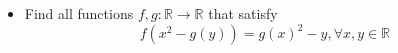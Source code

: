 \documentclass[11pt]{scrartcl}
\begin{document}
\begin{itemize}[label=,itemsep=0.4em,leftmargin=0em]
\begin{comment}
        Combining this with $(2)$, we conclude that the function satisfying these conditions is $f(m) = m, \forall m \in \bb{Z^+}$.

    \end{comment}

    \item \begin{btvn}
        Find all functions $f,g: \mathbb{R} \to \mathbb{R}$ that satisfy
    $$f(x^2-g(y))=g(x)^2-y, \forall x,y \in \mathbb{R}$$
    \end{btvn}
    \begin{comment}
        Let $P(x,y)$ denote the substitution into $(1)$. Let $a = g(0)$.

        \vocab{Claim 1:} $f$ is surjective and $g$ is injective.
        \begin{pro}
            From $P(x,0)$, we have $g(x)^2 = f(x^2 - a)$. Rewriting,
            \[
                f(x^2 - g(y)) = f(x^2 - a) - y, \forall x,y \in \mathbb{R} \tag{2}
            \]
            Suppose there exist $a, b$ such that $g(a) = g(b)$. Using $P(x,a)$ and $P(x,b)$, we find $a = b$, proving $g$ is injective.

            Moreover, from $(2)$ substituting $P(x, -y + f(x^2 - a))$, we conclude that $f$ is surjective.

            From $(1)$ substituting $P(-x,y)$, we get $g(x)^2 = g(-x)^2$. Since $g$ is injective, we have $g(x) = -g(-x)$ for all $x \neq 0$.
        \end{pro}

        \vocab{Claim 2:} $g$ is unbounded above.
        \begin{pro}
            Assume there exists $M$ such that $|g(x)| \leq M$. For any arbitrary $y_1, y_2$, there exist $x_1, x_2$ satisfying
            \[
                x_1^2 - x_2^2 = g(y_1) - g(y_2) \ra g(x_1)^2 - g(x_2)^2 = y_1 - y_2
            \]
            Choosing $y_1, y_2$ such that $y_1 - y_2 > 4M$ leads to a contradiction, hence $g$ is unbounded above.
        \end{pro}

        \vocab{Claim 3:} $f$ and $g$ are bijective.
        \begin{pro}
            Suppose $f(a) = f(b)$. Choose $y_0 > \max\{-a, -b\}$. Choose $x_1, x_2$ such that $x_1^2 - g(y_0) = a$ and $x_2^2 - g(y_0) = b$. Since $f$ is injective and $g$ is odd and injective, we deduce
            \[
                g(x_1)^2 - y_0 = g(x_2)^2 - y_0 \ra x_1 = x_2
            \]
            Thus, $f$ is injective, implying $f$ is bijective.


\end{comment}
\end{itemize}
\end{document}
